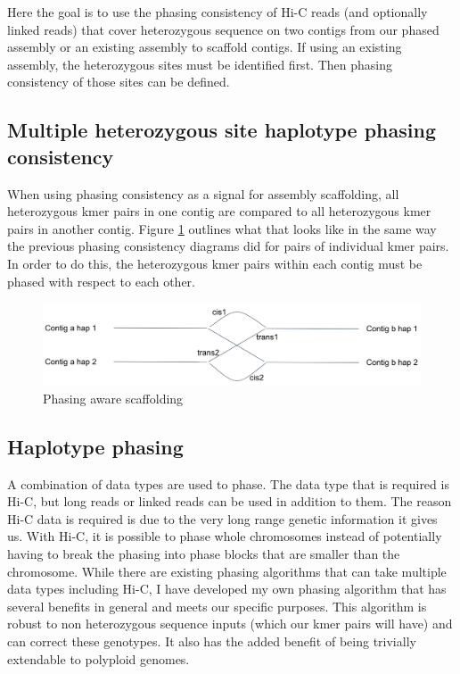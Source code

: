 \par{
Here the goal is to use the phasing consistency of Hi-C reads (and optionally linked reads) that cover heterozygous sequence on two contigs from our phased assembly or an existing assembly to scaffold contigs. If using an existing assembly, the heterozygous sites must be identified first. Then phasing consistency of those sites can be defined.
}

\subsection{Multiple heterozygous site haplotype phasing consistency}

\par{
When using phasing consistency as a signal for assembly scaffolding, all heterozygous kmer pairs in one contig are compared to all heterozygous kmer pairs in another contig. Figure \ref{figure:scaff} outlines what that looks like in the same way the previous phasing consistency diagrams did for pairs of individual kmer pairs. In order to do this, the heterozygous kmer pairs within each contig must be phased with respect to each other.
}

\begin{figure}[htbp!]
\caption{Phasing aware scaffolding}
\label{figure:scaff}
\begin{centering}
\includegraphics[width=\textwidth]{phasescaff.png}
\end{centering}

\end{figure}


\subsection{Haplotype phasing}

\par{
A combination of data types are used to phase. The data type that is required is Hi-C, but long reads or linked reads can be used in addition to them. The reason Hi-C data is required is due to the very long range genetic information it gives us. With Hi-C, it is possible to phase whole chromosomes instead of potentially having to break the phasing into phase blocks that are smaller than the chromosome. While there are existing phasing algorithms that can take multiple data types including Hi-C\cite{hapcut2}\cite{HICphasing}, I have developed my own phasing algorithm that has several benefits in general and meets our specific purposes. This algorithm is robust to non heterozygous sequence inputs (which our kmer pairs will have) and can correct these genotypes. It also has the added benefit of being trivially extendable to polyploid genomes.
}

